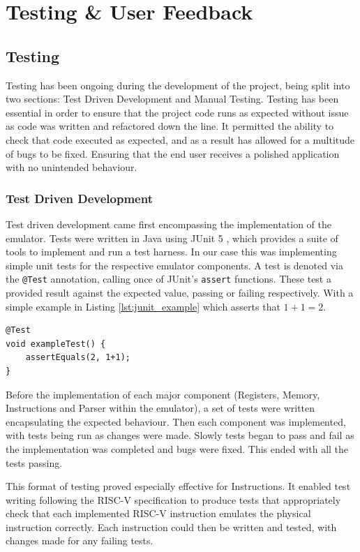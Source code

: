 \chapter{Testing \& User Feedback}
\label{ch:testing}
\section{Testing}
Testing has been ongoing during the development of the project, being split into two sections: Test Driven Development and Manual Testing. Testing has been essential in order to ensure that the project code runs as expected without issue as code was written and refactored down the line. It permitted the ability to check that code executed as expected, and as a result has allowed for a multitude of bugs to be fixed. Ensuring that the end user receives a polished application with no unintended behaviour.

\subsection{Test Driven Development}
Test driven development came first encompassing the implementation of the emulator. Tests were written in Java \cite{sunmicrosystems_2022_java} using JUnit 5 \cite{junitteam_2019_junit}, which provides a suite of tools to implement and run a test harness. In our case this was implementing simple unit tests for the respective emulator components. A test is denoted via the \verb|@Test| annotation, calling once of JUnit's \verb|assert| functions. These test a provided result against the expected value, passing or failing respectively. With a simple example in Listing \ref{lst:junit_example} which asserts that $1+1=2$.

\begin{lstlisting}[caption=JUnit test example, label=lst:junit_example]
@Test
void exampleTest() {
    assertEquals(2, 1+1);
}
\end{lstlisting}

Before the implementation of each major component (Registers, Memory, Instructions and Parser within the emulator), a set of tests were written encapsulating the expected behaviour. Then each component was implemented, with tests being run as changes were made. Slowly tests began to pass and fail as the implementation was completed and bugs were fixed. This ended with all the tests passing.

This format of testing proved especially effective for Instructions. It enabled test writing following the RISC-V specification \cite{riscv_2015_riscv} to produce tests that appropriately check that each implemented RISC-V instruction emulates the physical instruction correctly. Each instruction could then be written and tested, with changes made for any failing tests.

